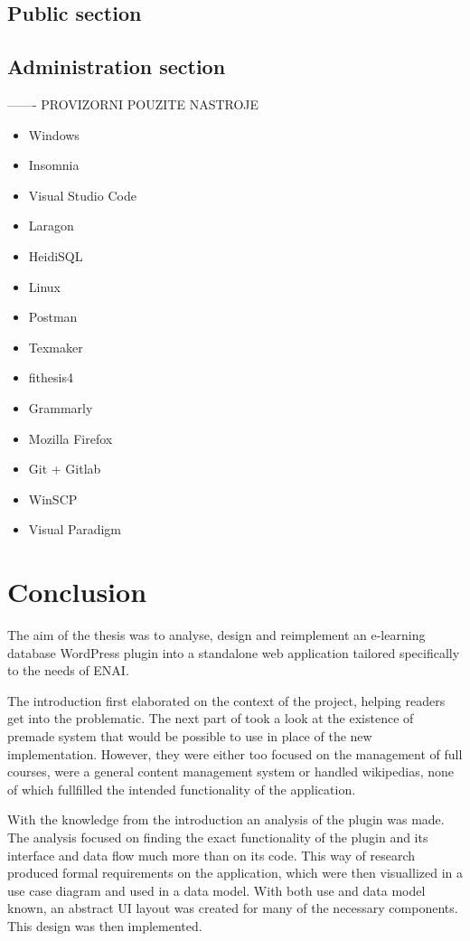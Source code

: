 \documentclass[
  digital,     %
  oneside,     %
  nosansbold,  %
  colorbold, %
  lof,         %
  lot,         %
]{fithesis4}
\begin{document}
\section{Public section}

\section{Administration section}

\newpage

------- PROVIZORNI POUZITE NASTROJE

\begin{itemize}
	\item Windows
	\item Insomnia
	\item Visual Studio Code
	\item Laragon
	\item HeidiSQL
	\item Linux
	\item Postman
	\item Texmaker
	\item fithesis4
	\item Grammarly
	\item Mozilla Firefox
	\item Git + Gitlab
	\item WinSCP
	\item Visual Paradigm
\end{itemize}

\newpage

\chapter{Conclusion}

The aim of the thesis was to analyse, design and reimplement an e-learning database WordPress plugin into a standalone web application tailored specifically to the needs of ENAI.

The introduction first elaborated on the context of the project, helping readers get into the problematic.  The next part of took a look at the existence of premade system that would be possible to use in place of the new implementation. However, they were either too focused on the management of full courses, were a general content management system or handled wikipedias, none of which fullfilled the intended functionality of the application.

With the knowledge from the introduction an analysis of the plugin was made. The analysis focused on finding the exact functionality of the plugin and its interface and data flow much more than on its code. This way of research produced formal requirements on the application, which were then visuallized in a use case diagram and used in a data model. With both use and data model known, an abstract UI layout was created for many of the necessary components. This design was then implemented.
\end{document}
